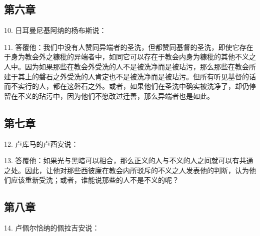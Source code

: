
\subsection{第六章}

10. 日耳曼尼基阿纳的杨布斯说：\par

11. 答覆他：我们中没有人赞同异端者的圣洗，但都赞同基督的圣洗，即使它存在于身为教会外之糠秕的异端者中，如同它可以存在于教会内身为糠秕的其他不义之人中。因为如果那些在教会外受洗的人不是被洗净而是被玷污，那么那些在教会所建于其上的磐石之外受洗的人肯定也不是被洗净而是被玷污。但所有听见基督的话而不实行的人，都在这磐石之外。或者，如果他们在圣洗中确实被洗净了，却仍停留在不义的玷污中，因为他们不愿改过迁善，那么异端者也是如此。\par


\subsection{第七章}

12. 卢库马的卢西安说：\par

13. 答覆他：如果光与黑暗可以相合，那么正义的人与不义的人之间就可以有共通之处。因此，让他对那些西彼廉在教会内所驳斥的不义之人发表他的判断，认为他们应该重新受洗；或者，谁能说那些的人不是不义的呢？\par


\subsection{第八章}

14. 卢佩尔恰纳的佩拉吉安说：\par

